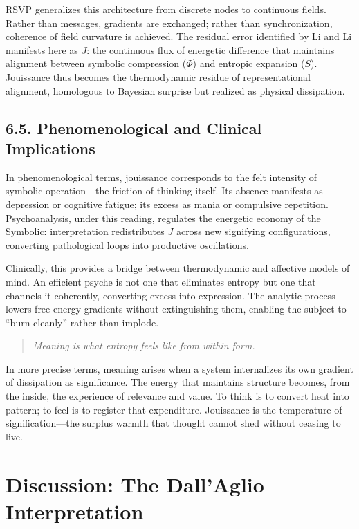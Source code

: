 \documentclass[12pt,a4paper]{article}
\begin{document}
RSVP generalizes this architecture from discrete nodes to continuous fields.  
Rather than messages, gradients are exchanged; rather than synchronization, coherence of field curvature is achieved.  
The residual error identified by Li and Li manifests here as \(J\): the continuous flux of energetic difference that maintains alignment between symbolic compression (\(\Phi\)) and entropic expansion (\(S\)).  
Jouissance thus becomes the thermodynamic residue of representational alignment, homologous to Bayesian surprise but realized as physical dissipation.

\subsection{6.5. Phenomenological and Clinical Implications}

In phenomenological terms, jouissance corresponds to the felt intensity of symbolic operation—the friction of thinking itself.  
Its absence manifests as depression or cognitive fatigue; its excess as mania or compulsive repetition.  
Psychoanalysis, under this reading, regulates the energetic economy of the Symbolic: interpretation redistributes \(J\) across new signifying configurations, converting pathological loops into productive oscillations.

Clinically, this provides a bridge between thermodynamic and affective models of mind.  
An efficient psyche is not one that eliminates entropy but one that channels it coherently, converting excess into expression.  
The analytic process lowers free-energy gradients without extinguishing them, enabling the subject to “burn cleanly” rather than implode.

\begin{quote}
\textit{Meaning is what entropy feels like from within form.}
\end{quote}

In more precise terms, meaning arises when a system internalizes its own gradient of dissipation as significance.  
The energy that maintains structure becomes, from the inside, the experience of relevance and value.  
To think is to convert heat into pattern; to feel is to register that expenditure.  
Jouissance is the temperature of signification—the surplus warmth that thought cannot shed without ceasing to live.

\section{Discussion: The Dall’Aglio Interpretation}
\label{sec:dallaglio}
\end{document}

